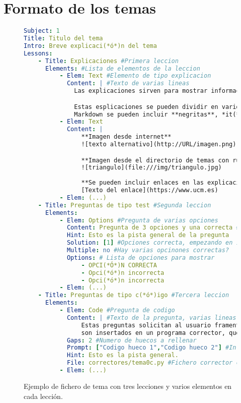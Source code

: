 \documentclass[]{article}
\begin{document}
\section{Formato de los temas}
\begin{figure}[tbp]
\begin{lstlisting}[language=yaml,basicstyle=\ttfamily\footnotesize]
Subject: 1
Title: Titulo del tema
Intro: Breve explicaci(*ó*)n del tema
Lessons:
    - Title: Explicaciones #Primera leccion
      Elements: #Lista de elementos de la leccion
          - Elem: Text #Elemento de tipo explicacion
            Content: | #Texto de varias lineas
              Las explicaciones sirven para mostrar informaci(*ó*)n al alumno. 

              Estas esplicaciones se pueden dividir en varios p(*á*)rrafos, y con 
              Markdown se pueden incluir **negritas**, *it(*a*)licas* y `c(*ó*)digo`.
          - Elem: Text
            Content: |
                **Imagen desde internet**
                ![texto alternativo](http://URL/imagen.png)

                **Imagen desde el directorio de temas con ruta relativa**
                ![triangulo](file:///img/triangulo.jpg)
  
                **Se pueden incluir enlaces en las explicaciones:**
                [Texto del enlace](https://www.ucm.es)
          - Elem: (...)
    - Title: Preguntas de tipo test #Segunda leccion
      Elements:
          - Elem: Options #Pregunta de varias opciones
            Content: Pregunta de 3 opciones y una correcta #Texto de la pregunta
            Hint: Esto es la pista general de la pregunta
            Solution: [1] #Opciones correcta, empezando en 1
            Multiple: no #Hay varias opcinones correctas?
            Options: # Lista de opciones para mostrar
                - OPCI(*Ó*)N CORRECTA
                - Opci(*ó*)n incorrecta
                - Opci(*ó*)n incorrecta
          - Elem: (...)
    - Title: Preguntas de tipo c(*ó*)igo #Tercera leccion
      Elements:
          - Elem: Code #Pregunta de codigo
            Content: | #Texto de la pregunta, varias lineas
                Estas preguntas solicitan al usuario framentos de c(*ó*)digo que
                son insertados en un programa corrector, que es evaluado.
            Gaps: 2 #Numero de huecos a rellenar
            Prompt: ["Codigo hueco 1","Codigo hueco 2"] #Informacion de cada hueco
            Hint: Esto es la pista general. 
            File: correctores/tema0c.py #Fichero corrector con 'huecos'
          - Elem: (...)
\end{lstlisting}
\caption{Ejemplo de fichero de tema con tres lecciones y varios elementos en cada lección.\label{fig:tema}}
\end{figure}
\end{document}
